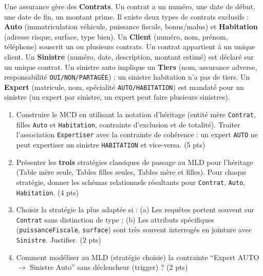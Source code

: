 \documentclass[11pt]{article}
\begin{document}
\begin{exercice}
Une assurance gère des \textbf{Contrats}. Un contrat a un numéro, une date de début, une date de fin, un montant prime. Il existe deux types de contrats exclusifs : \textbf{Auto} (immatriculation véhicule, puissance fiscale, bonus/malus) et \textbf{Habitation} (adresse risque, surface, type bien). Un \textbf{Client} (numéro, nom, prénom, téléphone) souscrit un ou plusieurs contrats. Un contrat appartient à un unique client. Un \textbf{Sinistre} (numéro, date, description, montant estimé) est déclaré sur un unique contrat. Un sinistre auto implique un \textbf{Tiers} (nom, assurance adverse, responsabilité \texttt{OUI/NON/PARTAGÉE}) ; un sinistre habitation n'a pas de tiers. Un \textbf{Expert} (matricule, nom, spécialité \texttt{AUTO/HABITATION}) est mandaté pour un sinistre (un expert par sinistre, un expert peut faire plusieurs sinistres).
\begin{enumerate}
    \item Construire le MCD en utilisant la notation d'héritage (entité mère \texttt{Contrat}, filles \texttt{Auto} et \texttt{Habitation}, contrainte d'exclusion et de totalité). Traiter l'association \texttt{Expertiser} avec la contrainte de cohérence : un expert \texttt{AUTO} ne peut expertiser un sinistre \texttt{HABITATION} et vice-versa. (5 pts)
    \item Présenter les \textbf{trois} stratégies classiques de passage au MLD pour l'héritage (Table mère seule, Tables filles seules, Tables mère et filles). Pour chaque stratégie, donner les schémas relationnels résultants pour \texttt{Contrat}, \texttt{Auto}, \texttt{Habitation}. (4 pts)
    \item Choisir la stratégie la plus adaptée si : (a) Les requêtes portent souvent sur \texttt{Contrat} sans distinction de type ; (b) Les attributs spécifiques (\texttt{puissanceFiscale}, \texttt{surface}) sont très souvent interrogés en jointure avec \texttt{Sinistre}. Justifier. (2 pts)
    \item Comment modéliser au MLD (stratégie choisie) la contrainte ``Expert AUTO $\to$ Sinistre Auto'' sans déclencheur (trigger) ? (2 pts)
\end{enumerate}
\end{exercice}
\end{document}
